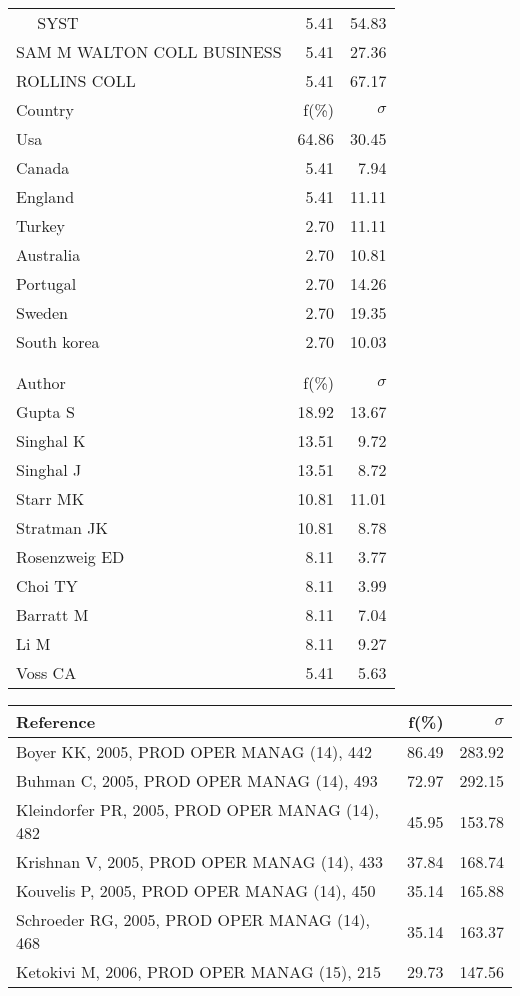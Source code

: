 \documentclass[a4paper,11pt]{report}
\begin{document}
\begin{landscape}
\begin{table}[!ht]
{\begin{tabular}{|l r r|}
$\quad$ SYST & 5.41 & 54.83\\
SAM M WALTON COLL BUSINESS & 5.41 & 27.36\\
ROLLINS COLL & 5.41 & 67.17\\
\hline
\hline
Country & f(\%) & $\sigma$\\
\hline
Usa & 64.86 & 30.45\\
Canada & 5.41 & 7.94\\
England & 5.41 & 11.11\\
Turkey & 2.70 & 11.11\\
Australia & 2.70 & 10.81\\
Portugal & 2.70 & 14.26\\
Sweden & 2.70 & 19.35\\
South korea & 2.70 & 10.03\\
 &  & \\
 &  & \\
\hline
\hline
Author & f(\%) & $\sigma$\\
\hline
Gupta S & 18.92 & 13.67\\
Singhal K & 13.51 & 9.72\\
Singhal J & 13.51 & 8.72\\
Starr MK & 10.81 & 11.01\\
Stratman JK & 10.81 & 8.78\\
Rosenzweig ED & 8.11 & 3.77\\
Choi TY & 8.11 & 3.99\\
Barratt M & 8.11 & 7.04\\
Li M & 8.11 & 9.27\\
Voss CA & 5.41 & 5.63\\
\hline
\end{tabular}
}
{\scriptsize\begin{tabular}{|l r r|}
\hline
Reference & f(\%) & $\sigma$\\
\hline
Boyer KK, 2005, PROD OPER MANAG (14), 442 & 86.49 & 283.92\\
Buhman C, 2005, PROD OPER MANAG (14), 493 & 72.97 & 292.15\\
Kleindorfer PR, 2005, PROD OPER MANAG (14), 482 & 45.95 & 153.78\\
Krishnan V, 2005, PROD OPER MANAG (14), 433 & 37.84 & 168.74\\
Kouvelis P, 2005, PROD OPER MANAG (14), 450 & 35.14 & 165.88\\
Schroeder RG, 2005, PROD OPER MANAG (14), 468 & 35.14 & 163.37\\
Ketokivi M, 2006, PROD OPER MANAG (15), 215 & 29.73 & 147.56\\

\end{tabular}}
\end{table}
\end{landscape}
\end{document}
